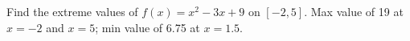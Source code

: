 {Find the extreme values of $f(x) =x^2-3x+9$ on $[-2,5]$.
}
{Max value of 19 at $x=-2$ and $x=5$; min value of 6.75 at $x=1.5$.
}
